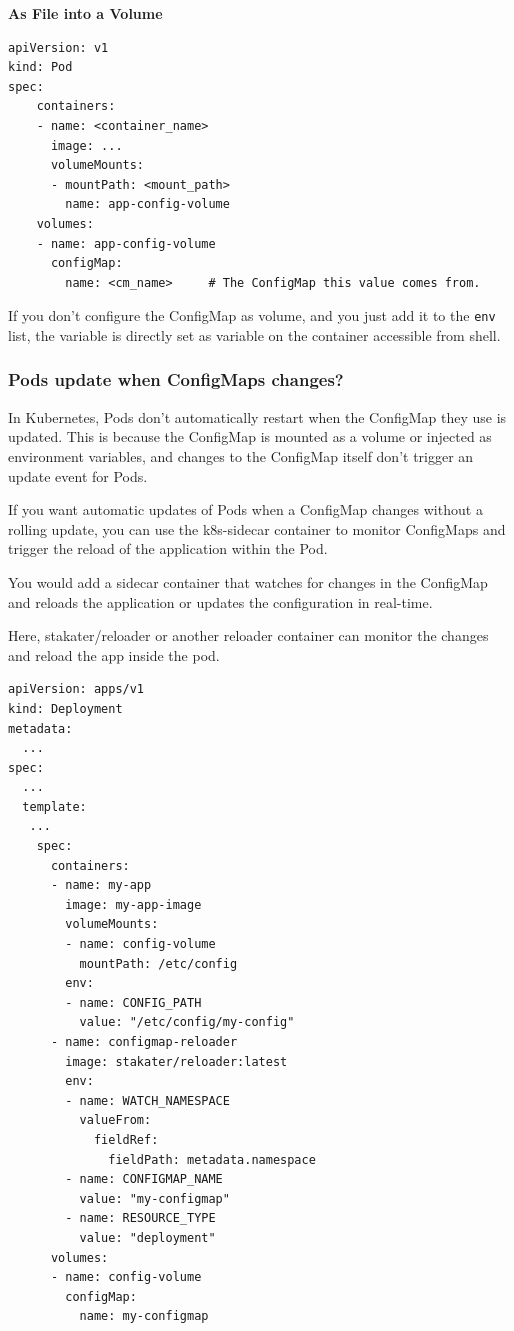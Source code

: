 \documentclass{article}
\newenvironment{blocktemplateII}[1]{%
    \tcolorbox[beamer,%
    noparskip,breakable,
    colframe=Green,%
    colbacklower=LimeGreen!75!LightGreen,%
    title=#1]}%
    {\endtcolorbox}
\newenvironment{codetemplate}[1][]{%
  \mybasecolorbox[#1]
  \itshape
}{%
  \endmybasecolorbox
}
\begin{document}
\textbf{As File into a Volume}
\begin{codetemplate}{}
\begin{verbatim}
apiVersion: v1
kind: Pod
spec:
    containers:
    - name: <container_name>
      image: ...
      volumeMounts:
      - mountPath: <mount_path>
        name: app-config-volume
    volumes:
    - name: app-config-volume
      configMap:
        name: <cm_name>     # The ConfigMap this value comes from.
\end{verbatim}
\end{codetemplate}

\begin{blocktemplateII}{NOTE}
If you don't configure the ConfigMap as volume, and you just add it to the \verb|env| list, the variable is directly set as variable on the container accessible from shell.
\end{blocktemplateII}

\subsubsection{Pods update when ConfigMaps changes?}
In Kubernetes, Pods don’t automatically restart when the ConfigMap they use is updated. This is because the ConfigMap is mounted as a volume or injected as environment variables, and changes to the ConfigMap itself don't trigger an update event for Pods.

If you want automatic updates of Pods when a ConfigMap changes without a rolling update, you can use the k8s-sidecar container to monitor ConfigMaps and trigger the reload of the application within the Pod.

You would add a sidecar container that watches for changes in the ConfigMap and reloads the application or updates the configuration in real-time.

Here, stakater/reloader or another reloader container can monitor the changes and reload the app inside the pod.

\begin{codetemplate}{}
\begin{verbatim}
apiVersion: apps/v1
kind: Deployment
metadata:
  ...
spec:
  ...
  template:
   ...
    spec:
      containers:
      - name: my-app
        image: my-app-image
        volumeMounts:
        - name: config-volume
          mountPath: /etc/config
        env:
        - name: CONFIG_PATH
          value: "/etc/config/my-config"
      - name: configmap-reloader
        image: stakater/reloader:latest
        env:
        - name: WATCH_NAMESPACE
          valueFrom:
            fieldRef:
              fieldPath: metadata.namespace
        - name: CONFIGMAP_NAME
          value: "my-configmap"
        - name: RESOURCE_TYPE
          value: "deployment"
      volumes:
      - name: config-volume
        configMap:
          name: my-configmap
\end{verbatim}
\end{codetemplate}
\end{document}
